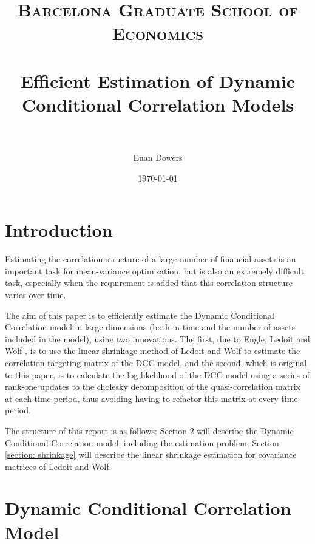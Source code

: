 \documentclass{article} %
\title{
\normalfont \normalsize
\textsc{Barcelona Graduate School of Economics} \\ [20pt] %
\horrule{0.5pt} \\[0.1cm] %
\Large Efficient Estimation of Dynamic Conditional Correlation Models \\ %
\horrule{0.5pt} \\[0.1cm] %
}
\author{Euan Dowers} %
\date{\normalsize\today} %
\numberwithin{equation}{section} %
\numberwithin{figure}{section} %
\numberwithin{table}{section} %
\begin{document}
\maketitle %

\pagebreak

\tableofcontents

\pagebreak


\section{Introduction}

Estimating the correlation structure of a large number of financial assets is an important task for mean-variance optimisation, but is also an extremely difficult task, especially when the requirement is added that this correlation structure varies over time.

The aim of this paper is to efficiently estimate the Dynamic Conditional Correlation model in large dimensions (both in time and the number of assets included in the model), using two innovations. The first, due to Engle, Ledoit and Wolf \cite{engle ledoit and wolf}, is to use the linear shrinkage method of Ledoit and Wolf \cite{ledoit and wolf} to estimate the correlation targeting matrix of the DCC model, and the second, which is original to this paper, is to calculate the log-likelihood of the DCC model using a series of rank-one updates to the cholesky decomposition of the quasi-correlation matrix at each time period, thus avoiding having to refactor this matrix at every time period.

The structure of this report is as follows: Section \ref{section: dcc} will describe the Dynamic Conditional Correlation model, including the estimation problem; Section \ref{section: shrinkage} will describe the linear shrinkage estimation for covariance matrices of Ledoit and Wolf.


\section{Dynamic Conditional Correlation Model} \label{section: dcc}
\end{document}
